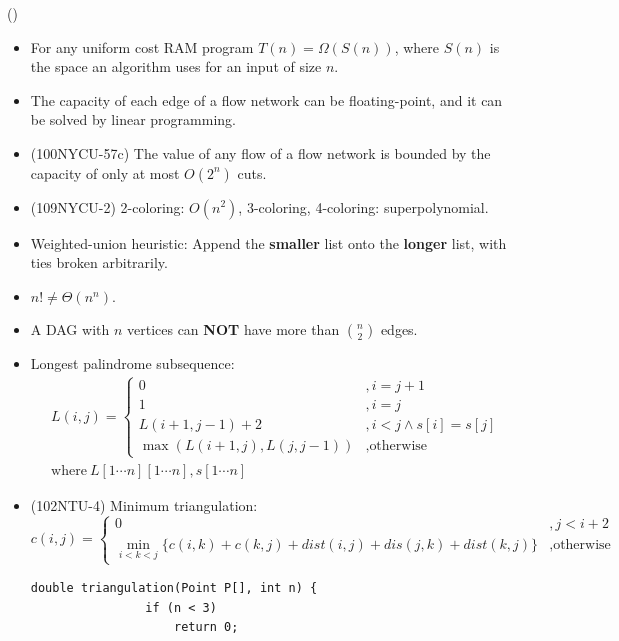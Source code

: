 \item \begin{theorem}{()} \quad\quad
    \begin{itemize}
        \item For any uniform cost RAM program $T(n) = \Omega(S(n))$, where $S(n)$ is the space an algorithm uses for an input of size $n$.
        \item The capacity of each edge of a flow network can be floating-point, and it can be solved by linear programming.
        \item (100NYCU-57c) The value of any flow of a flow network is bounded by the capacity of only at most $O(2^n)$ cuts.
        \item (109NYCU-2) 2-coloring: $O(n^2)$, 3-coloring, 4-coloring: superpolynomial.
        \item Weighted-union heuristic: Append the \textbf{smaller} list onto the \textbf{longer} list, with ties broken arbitrarily.
        \item $n! \neq \Theta(n^n)$.
        \item A DAG with $n$ vertices can \textbf{NOT} have more than $\binom{n}{2}$ edges.
        \item Longest palindrome subsequence: \begin{equation}
            \begin{aligned}
                & L(i, j) = \begin{cases}
                    0 &, i = j + 1 \\
                    1 &, i = j \\
                    L(i + 1, j - 1) + 2 &, i < j \land s[i] = s[j] \\
                    \max(L(i + 1, j), L(j, j - 1)) &, \text{otherwise}
                \end{cases} \\
                & \text{where} \ L[1 \cdots n][1 \cdots n], s[1 \cdots n]
            \end{aligned}
        \end{equation}
        \item (102NTU-4) Minimum triangulation: \begin{equation}
            c(i, j) = \begin{cases}
                0 &, j < i + 2 \\
                \min\limits_{i < k < j}\{c(i, k) + c(k, j) + dist(i, j) + dis(j, k) + dist(k, j)\} &, \text{otherwise}
            \end{cases}
        \end{equation} \begin{lstlisting}[caption={Minimum triangulation.}, captionpos=b]
            double triangulation(Point P[], int n) {
                if (n < 3)
                    return 0;
                

\end{lstlisting}
\end{itemize}
\end{theorem}
